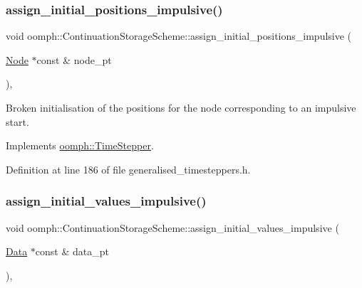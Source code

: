 \subsubsection{\texorpdfstring{assign\+\_\+initial\+\_\+positions\+\_\+impulsive()}{assign\_initial\_positions\_impulsive()}}
{\footnotesize\ttfamily void oomph\+::\+Continuation\+Storage\+Scheme\+::assign\+\_\+initial\+\_\+positions\+\_\+impulsive (\begin{DoxyParamCaption}\item[{\hyperlink{classoomph_1_1Node}{Node} $\ast$const \&}]{node\+\_\+pt }\end{DoxyParamCaption})\hspace{0.3cm}{\ttfamily [inline]}, {\ttfamily [virtual]}}



Broken initialisation of the positions for the node corresponding to an impulsive start. 



Implements \hyperlink{classoomph_1_1TimeStepper_ab66972f0eaf3ba34645793e23e46afd5}{oomph\+::\+Time\+Stepper}.



Definition at line 186 of file generalised\+\_\+timesteppers.\+h.

\mbox{\label{classoomph_1_1ContinuationStorageScheme_a24344971f7f5dd254488f7373ceb2074}} 
\subsubsection{\texorpdfstring{assign\+\_\+initial\+\_\+values\+\_\+impulsive()}{assign\_initial\_values\_impulsive()}}
{\footnotesize\ttfamily void oomph\+::\+Continuation\+Storage\+Scheme\+::assign\+\_\+initial\+\_\+values\+\_\+impulsive (\begin{DoxyParamCaption}\item[{\hyperlink{classoomph_1_1Data}{Data} $\ast$const \&}]{data\+\_\+pt }\end{DoxyParamCaption})\hspace{0.3cm}{\ttfamily [inline]}, {\ttfamily [virtual]}}



